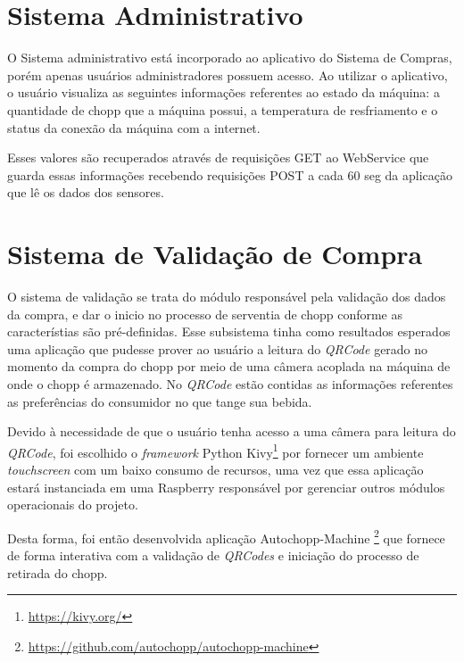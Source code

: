     \section[Sistema Administrativo]{Sistema Administrativo}

        O Sistema administrativo está incorporado ao aplicativo do Sistema de Compras, porém apenas usuários
        administradores possuem acesso. Ao utilizar o aplicativo, o usuário visualiza
        as seguintes informações referentes ao estado da máquina: a quantidade de chopp que a
        máquina possui, a temperatura de resfriamento e o status da conexão da máquina com a internet.

        Esses valores são recuperados através de requisições GET ao WebService que guarda essas informações recebendo
        requisições POST a cada 60 seg da aplicação que lê os dados dos sensores. 
    
    \section[Sistema de Validação de Compra]{Sistema de Validação de Compra}
        
        O sistema de validação se trata do módulo responsável pela validação dos dados da compra,
        e dar o inicio no processo de serventia de chopp conforme as característias são pré-definidas.
        Esse subsistema tinha como resultados esperados uma aplicação que pudesse prover ao usuário
        a leitura do \textit{QRCode} gerado no momento da compra do chopp por meio de uma câmera 
        acoplada na máquina de onde o chopp é armazenado. No \textit{QRCode} estão contidas as informações
        referentes as preferências do consumidor no que tange sua bebida.
        
        Devido à necessidade de que o usuário tenha acesso a uma câmera para leitura do \textit{QRCode},
        foi escolhido o \textit{framework} Python Kivy\footnote{\url{https://kivy.org/}} por fornecer um ambiente
        \textit{touchscreen} com um baixo consumo de recursos, uma vez que essa aplicação estará 
        instanciada em uma Raspberry responsável por gerenciar outros módulos operacionais do projeto.

        Desta forma, foi então desenvolvida aplicação Autochopp-Machine \footnote{\url{https://github.com/autochopp/autochopp-machine}} que fornece de forma interativa 
        com a validação de \textit{QRCodes} e iniciação do processo de retirada do chopp. 

